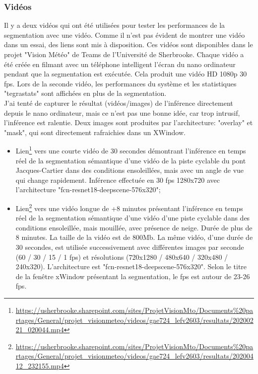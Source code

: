 \subsubsection{Vidéos}
\noindent Il y a deux vidéos qui ont été utilisées pour tester les performances de la segmentation avec une vidéo. Comme il n'est pas évident de montrer une vidéo dans un essai, des liens sont mis à disposition. Ces vidéos sont disponibles dans le projet "Vision Météo" de Teams de l'Université de Sherbrooke. Chaque vidéo a été créée en filmant avec un téléphone intelligent l'écran du nano ordinateur pendant que la segmentation est exécutée. Cela produit une vidéo HD 1080p 30 \acrshort{fps}. Lors de la seconde vidéo, les performances du système et les statistiques "tegrastats" sont affichées en plus de la segmentation.
\vspace{\baselineskip}
\\
\noindent J'ai tenté de capturer le résultat (vidéos/images) de l'inférence directement depuis le nano ordinateur, mais ce n'est pas une bonne idée, car trop intrusif, l'inférence est ralentie. Deux images sont produites par l'architecture: "overlay" et "mask", qui sont directement rafraichies dans un XWindow. 
\begin{itemize}
   \item Lien\footnote{\url{https://usherbrooke.sharepoint.com/sites/ProjetVisionMto/Documents\%20partages/General/projet_visionmeteo/videos/gae724_lefv2603/resultats/20200221_020044.mp4}} vers une courte vidéo de 30 secondes démontrant l'inférence en temps réel de la segmentation sémantique d'une vidéo de la piste cyclable du pont Jacques-Cartier dans des conditions ensoleillées, mais avec un angle de vue qui change rapidement. Inférence effectuée en 30 \acrshort{fps} 1280x720 avec l'architecture "fcn-resnet18-deepscene-576x320";
   \item Lien\footnote{\url{https://usherbrooke.sharepoint.com/sites/ProjetVisionMto/Documents\%20partages/General/projet_visionmeteo/videos/gae724_lefv2603/resultats/20200412_232155.mp4}} vers une vidéo longue de +8 minutes présentant l'inférence en temps réel de la segmentation sémantique d'une vidéo d'une piste cyclable dans des conditions ensoleillée, mais mouillée, avec présence de neige. Durée de plus de 8 minutes. La taille de la vidéo est de 800Mb. La même vidéo, d'une durée de 30 secondes, est utilisée successivement avec différentes images par seconde (60 / 30 / 15 / 1 \acrshort{fps}) et résolutions (720x1280 / 480x640 / 320x480 / 240x320). L'architecture est "fcn-resnet18-deepscene-576x320". Selon le titre de la fenêtre xWindow présentant la segmentation, le \acrshort{fps} est autour de 23-26 \acrshort{fps}.
\end{itemize}
